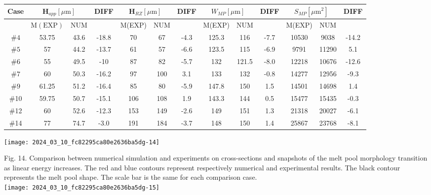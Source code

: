 \documentclass[10pt]{article}
\begin{document}
\begin{center}
\begin{tabular}{|c|c|c|c|c|c|c|c|c|c|c|c|c|}
\hline
\multirow{2}{*}{Case} & \multicolumn{2}{|c|}{$\boldsymbol{H}_{a p p}[\mu \mathrm{m}]$} & \multirow[b]{2}{*}{DIFF} & \multicolumn{2}{|c|}{$\boldsymbol{H}_{R Z}[\mu \mathrm{m}]$} & \multirow[b]{2}{*}{DIFF} & \multicolumn{2}{|c|}{$W_{M P}[\mu \mathrm{m}]$} & \multirow[b]{2}{*}{DIFF} & \multicolumn{2}{|c|}{$S_{M P}\left[\mu \mathrm{m}^{2}\right]$} & \multirow[b]{2}{*}{DIFF} \\
\hline
 & $\mathrm{M}(\mathrm{EXP})$ & NUM &  & M(EXP) & NUM &  & M(EXP) & NUM &  & M(EXP) & NUM &  \\
\hline
$\# 4$ & 53.75 & 43.6 & -18.8 & 70 & 67 & -4.3 & 125.3 & 116 & -7.7 & 10530 & 9038 & -14.2 \\
\hline
$\# 5$ & 57 & 44.2 & -13.7 & 61 & 57 & -6.6 & 123.5 & 115 & -6.9 & 9791 & 11290 & 5.1 \\
\hline
$\# 6$ & 55 & 49.5 & -10 & 87 & 82 & -5.7 & 132 & 121.5 & -8.0 & 12218 & 10676 & -12.6 \\
\hline
$\# 7$ & 60 & 50.3 & -16.2 & 97 & 100 & 3.1 & 133 & 132 & -0.8 & 14277 & 12956 & -9.3 \\
\hline
$\# 9$ & 61.25 & 51.2 & -16.4 & 85 & 80 & -5.9 & 147.8 & 150 & 1.5 & 14501 & 14698 & 1.4 \\
\hline
\#10 & 59.75 & 50.7 & -15.1 & 106 & 108 & 1.9 & 143.3 & 144 & 0.5 & 15477 & 15435 & -0.3 \\
\hline
\#12 & 60 & 52.6 & -12.3 & 153 & 149 & -2.6 & 149 & 151 & 1.3 & 21318 & 20027 & -6.1 \\
\hline
\#14 & 77 & 74.7 & -3.0 & 191 & 184 & -3.7 & 148 & 150 & 1.4 & 25867 & 23768 & -8.1 \\
\hline
\end{tabular}
\end{center}

\begin{center}
\texttt{[image: 2024\_03\_10\_fc82295ca80e2636ba5dg-14]}
\end{center}

Fig. 14. Comparison between numerical simulation and experiments on cross-sections and snapshots of the melt pool morphology transition as linear energy increases. The red and blue contours represent respectively numerical and experimental results. The black contour represents the melt pool shape. The scale bar is the same for each comparison case.\\
\texttt{[image: 2024\_03\_10\_fc82295ca80e2636ba5dg-15]}
\end{document}
